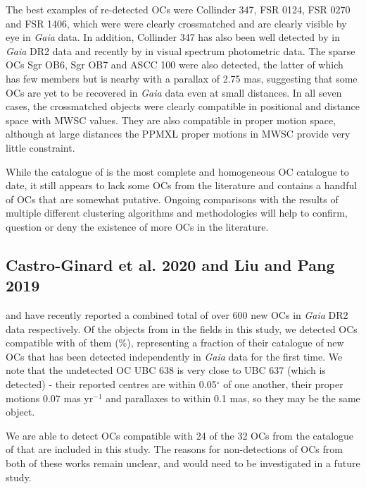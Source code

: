 The best examples of re-detected OCs were Collinder 347, FSR 0124, FSR 0270 and FSR 1406, which were were clearly crossmatched and are clearly visible by eye in \emph{Gaia} data. In addition, Collinder 347 has also been well detected by \cite{piatti_extended_2019} in \emph{Gaia} DR2 data and recently by \cite{claria_ccd_2019} in visual spectrum photometric data. The sparse OCs Sgr OB6, Sgr OB7 and ASCC 100 were also detected, the latter of which has few members but is nearby with a parallax of 2.75 mas, suggesting that some OCs are yet to be recovered in \emph{Gaia} data even at small distances. In all seven cases, the crossmatched objects were clearly compatible in positional and distance space with MWSC values. They are also compatible in proper motion space, although at large distances the PPMXL proper motions in MWSC provide very little constraint.

While the catalogue of \cite{cantat-gaudin_clusters_2020} is the most complete and homogeneous OC catalogue to date, it still appears to lack some OCs from the literature and contains a handful of OCs that are somewhat putative. Ongoing comparisons with the results of multiple different clustering algorithms and methodologies will help to confirm, question or deny the existence of more OCs in the literature.


\subsection{Castro-Ginard et al. 2020 and Liu and Pang 2019}

\cite{castro-ginard_hunting_2020} and \cite{liu_catalog_2019} have recently reported a combined total of over 600 new OCs in \emph{Gaia} DR2 data respectively. Of the objects from \cite{castro-ginard_hunting_2020} in the fields in this study, we detected OCs compatible with of them (\%), representing a fraction of their catalogue of new OCs that has been detected independently in \emph{Gaia} data for the first time. We note that the undetected OC UBC 638 is very close to UBC 637 (which is detected) - their reported centres are within 0.05$^{\circ}$ of one another, their proper motions 0.07 mas yr$^{-1}$ and parallaxes to within 0.1 mas, so they may be the same object.

We are able to detect OCs compatible with 24 of the 32 OCs from the catalogue of \cite{liu_catalog_2019} that are included in this study. The reasons for non-detections of OCs from both of these works remain unclear, and would need to be investigated in a future study.



